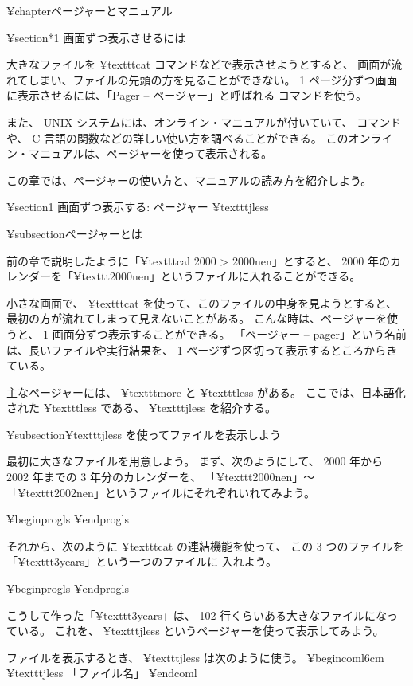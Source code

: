 ¥chapter{ページャーとマニュアル}

¥section*{1 画面ずつ表示させるには}

大きなファイルを ¥texttt{cat} コマンドなどで表示させようとすると、
画面が流れてしまい、ファイルの先頭の方を見ることができない。
 1 ページ分ずつ画面に表示させるには、「Pager -- ページャー」と呼ばれる
コマンドを使う。

また、 UNIX システムには、オンライン・マニュアルが付いていて、
コマンドや、 C 言語の関数などの詳しい使い方を調べることができる。
このオンライン・マニュアルは、ページャーを使って表示される。

この章では、ページャーの使い方と、マニュアルの読み方を紹介しよう。

¥section{1 画面ずつ表示する: ページャー ¥texttt{jless}}

¥subsection{ページャーとは}

前の章で説明したように「¥texttt{cal 2000 > 2000nen}」とすると、
 2000 年のカレンダーを「¥texttt{2000nen}」というファイルに入れることができる。

小さな画面で、 ¥texttt{cat} を使って、このファイルの中身を見ようとすると、
最初の方が流れてしまって見えないことがある。
こんな時は、ページャーを使うと、 1 画面分ずつ表示することができる。
「ページャー -- pager」という名前は、長いファイルや実行結果を、
 1 ページずつ区切って表示するところからきている。

主なページャーには、 ¥texttt{more} と ¥texttt{less} がある。
ここでは、日本語化された ¥texttt{less} である、 ¥texttt{jless} を紹介する。

¥subsection{¥texttt{jless} を使ってファイルを表示しよう}

最初に大きなファイルを用意しよう。
まず、次のようにして、 2000 年から 2002 年までの 3 年分のカレンダーを、
「¥texttt{2000nen}」〜「¥texttt{2002nen}」というファイルにそれぞれいれてみよう。

¥begin{progls}
%
¥end{progls}

それから、次のように ¥texttt{cat} の連結機能を使って、
この 3 つのファイルを「¥texttt{3years}」という一つのファイルに
入れよう。

¥begin{progls}
%
¥end{progls}

こうして作った「¥texttt{3years}」は、
 102 行くらいある大きなファイルになっている。
これを、 ¥texttt{jless} というページャーを使って表示してみよう。

ファイルを表示するとき、 ¥texttt{jless} は次のように使う。
¥begin{coml}{6cm}
¥texttt{jless} 「ファイル名」
¥end{coml}

